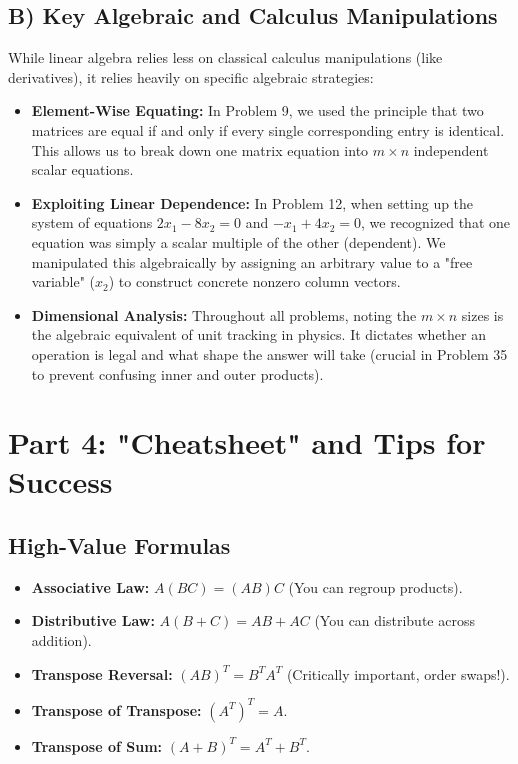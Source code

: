 \documentclass{article}
\begin{document}
\subsection*{B) Key Algebraic and Calculus Manipulations}
While linear algebra relies less on classical calculus manipulations (like derivatives), it relies heavily on specific algebraic strategies:
\begin{itemize}
    \item \textbf{Element-Wise Equating:} In Problem 9, we used the principle that two matrices are equal if and only if every single corresponding entry is identical. This allows us to break down one matrix equation into $m \times n$ independent scalar equations.
    \item \textbf{Exploiting Linear Dependence:} In Problem 12, when setting up the system of equations $2x_1 - 8x_2 = 0$ and $-x_1 + 4x_2 = 0$, we recognized that one equation was simply a scalar multiple of the other (dependent). We manipulated this algebraically by assigning an arbitrary value to a "free variable" ($x_2$) to construct concrete nonzero column vectors.
    \item \textbf{Dimensional Analysis:} Throughout all problems, noting the $m \times n$ sizes is the algebraic equivalent of unit tracking in physics. It dictates whether an operation is legal and what shape the answer will take (crucial in Problem 35 to prevent confusing inner and outer products).
\end{itemize}

\section*{Part 4: "Cheatsheet" and Tips for Success}

\subsection*{High-Value Formulas}
\begin{itemize}
    \item \textbf{Associative Law:} $A(BC) = (AB)C$ (You can regroup products).
    \item \textbf{Distributive Law:} $A(B + C) = AB + AC$ (You can distribute across addition).
    \item \textbf{Transpose Reversal:} $(AB)^T = B^T A^T$ (Critically important, order swaps!).
    \item \textbf{Transpose of Transpose:} $(A^T)^T = A$.
    \item \textbf{Transpose of Sum:} $(A + B)^T = A^T + B^T$.
\end{itemize}
\end{document}
